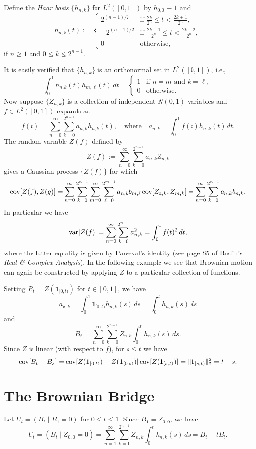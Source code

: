 \documentclass[../../../Master/AppliedStochastics.tex]{subfiles}
\begin{document}
\begin{defn}
Define the \emph{Haar basis} $\{h_{n,k}\}$ for $L^2([0,1])$ by $h_{0,0}\equiv 1$ and $$h_{n,k}(t):=\begin{cases}2^{(n-1)/2}&\text{if }\frac{2k}{2^n}\leq t<\frac{2k+1}{2^n},\\-2^{(n-1)/2}&\text{if }\frac{2k+1}{2^n}\leq t<\frac{2k+2}{2^n},\\0&\text{otherwise,}\end{cases}$$ if $n\geq 1$ and $0\leq k\leq 2^{n-1}$.
\end{defn}

It is easily verified that $\{h_{n,k}\}$ is an orthonormal set in $L^2([0,1])$, i.e., $$\int_0^1h_{n,k}(t)h_{m,\ell}(t)\,dt=\begin{cases}1&\text{if $n=m$ and $k=\ell$},\\0&\text{otherwise}.\end{cases}$$ Now suppose $\{Z_{n,k}\}$ is a collection of independent $N(0,1)$ variables and $f\in L^2([0,1])$ expands as $$f(t)=\sum_{n=0}^\infty\sum_{k=0}^{2^{n-1}}a_{n,k}h_{n,k}(t),\quad\text{where}\quad a_{n,k}=\int_0^1f(t)h_{n,k}(t)\,dt.$$ The random variable $Z(f)$ defined by $$Z(f):=\sum_{n=0}^\infty\sum_{k=0}^{2^{n-1}}a_{n,k}Z_{n,k}$$ gives a Gaussian process $\{Z(f)\}$ for which $$\operatorname{cov}[Z(f),Z(g)]=\sum_{n=0}^\infty\sum_{k=0}^{2^{n-1}}\sum_{m=0}^\infty\sum_{\ell=0}^{2^{m-1}}a_{n,k}b_{m,\ell}\operatorname{cov}[Z_{n,k},Z_{m,k}]=\sum_{n=0}^\infty\sum_{k=0}^{2^{n-1}}a_{n,k}b_{n,k}.$$ In particular we have $$\operatorname{var}[Z(f)]=\sum_{n=0}^\infty\sum_{k=0}^{2^{n-1}}a_{n,k}^2=\int_0^1f(t)^2\,dt,$$ where the latter equality is given by Parseval's identity (see page 85 of Rudin's \emph{Real \& Complex Analysis}). In the following example we see that Brownian motion can again be constructed by applying $Z$ to a particular collection of functions.
 
\begin{exmp}
Setting $B_t=Z(\mathbf{1}_{[0,t)})$ for $t\in[0,1]$, we have $$a_{n,k}=\int_0^1\mathbf{1}_{[0,t)}h_{n,k}(s)\,ds=\int_0^th_{n,k}(s)\,ds$$ and $$B_t=\sum_{n=0}^\infty\sum_{k=0}^{2^{n-1}}Z_{n,k}\int_0^th_{n,k}(s)\,ds.$$ Since $Z$ is linear (with respect to $f$), for $s\leq t$ we have $$\operatorname{cov}[B_t-B_s]=\operatorname{cov}[Z(\mathbf{1}_{[0,t)})-Z(\mathbf{1}_{[0,s)})]\operatorname{cov}[Z(\mathbf{1}_{[s,t)})]=\|\mathbf{1}_{[s,t)}\|_2^2=t-s.$$
\end{exmp}

\section{The Brownian Bridge}
Let $U_t=(B_t\mid B_1=0)$ for $0\leq t\leq 1$. Since $B_1=Z_{0,0}$, we have $$U_t=(B_t\mid Z_{0,0}=0)=\sum_{n=1}^\infty\sum_{k=1}^{2^{n-1}}Z_{n,k}\int_0^th_{n,k}(s)\,ds=B_t-tB_t.$$



%
\end{document}

